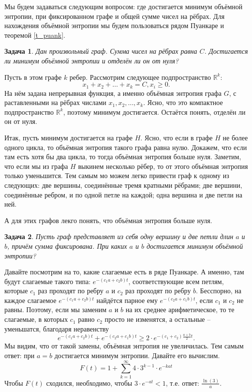 \documentclass[11pt]{article}
\theoremstyle{definition}
\theoremstyle{plain}
\theoremstyle{plain}
\newtheorem{problem}{Задача}
\def\geq{\geqslant}
\begin{document}
Мы будем задаваться следующим вопросом: где достигается минимум объёмной энтропии, при фиксированном графе и общей сумме чисел на рёбрах.
Для нахождения объёмной энтропии мы будем пользоваться рядом Пуанкаре и теоремой \ref{t_puank}.

\begin{problem}\label{z_first}
Дан произвольный граф. Сумма чисел на рёбрах равна $C$. Достигается ли минимум объёмной энтропии и отделён ли он от нуля?
\end{problem}
Пусть в этом графе $k$ ребер. Рассмотрим следующее подпространство $\mathbb{R}^k$:
$$
x_1 + x_2 + \dots + x_k = C, x_i \geq 0.
$$
На нём задана непрерывная функция, а именно объёмная энтропия графа $G$, 
с раставленными на рёбрах числами $x_1, x_2, \dots,x_k$.
Ясно, что это компактное подпространство $\mathbb{R}^k$, поэтому минимум достигается.
Остаётся понять, отделён ли он от нуля.

Итак, пусть минимум достигается на графе $H$. Ясно, что если в графе $H$ не более одного цикла, то объёмная энтропия такого графа равна нулю.
Докажем, что если там есть хотя бы два цикла, то тогда объёмная энтропия больше нуля.
Заметим, что если мы из графа $H$ выкинем несколько рёбер, то от этого объёмная энтропия только уменьшится. 
Тем самым мо можем легко привести граф к одному из следующих: 
две вершины, соединённые тремя кратными рёбрами; 
две вершини, соединённые ребром, и по одной петле на каждой;
одна вершина и две петли на ней.

А для этих графов лекго понять, что объёмная энтропия больше нуля.



\begin{problem}\label{z_two_circ} 
Пусть граф представляет из себя одну вершину и две петли длин $a$ и $b$, причём сумма фиксирована. 
При каких $a$ и $b$ достигается минимум объёмной энтропии?
\end{problem}

Давайте посмотрим на то, какие слагаемые есть в ряде Пуанкаре. А именно, там будут слагаемые такого типа: $e^{-(c_1 a + c_2 b)t}$, 
соответствующие всем петлям, которые $c_1$ раз проходят по ребру $a$ и $c_2$ раз проходят по ребру $b$. 
Бесспорно, на каждое слагаемое $e^{-(c_1 a + c_2 b)t}$ найдётся парное ему $e^{-(c_2 a + c_1 b)t}$, если $c_1$ и $c_2$ не равны.
Поэтому, если мы заменим $a$ и $b$ на их среднее арифметическое, то те слагаемые, в которых $c_1$ равно $c_2$ просто не изменятся,
а остальные -- уменьшатся, благодаря неравенству 
$$
e^{-(c_1 a + c_2 b)t} + e^{-(c_2 a + c_1 b)t} \geq 2 \cdot e^{-(c_1 + c_2)\frac{a + b}{2}t}.
$$
Мы видим, что от такой замены, объёмная энтропия не увеличилась. 
Тем самым ответ: при $a = b$ достигается минимум энтропии. Давайте его вычислим.
$$
F(t) = 1 + \sum_{k=1}^{\infty} 4 \cdot 3^{k-1} \cdot e^{-ka t} 
$$
Чтобы $F(t)$ сходился, необходимо, чтобы $3\cdot e^{-at} < 1$, т.е. ответ: $\frac{\ln(3)}{a}$.
\end{document}
